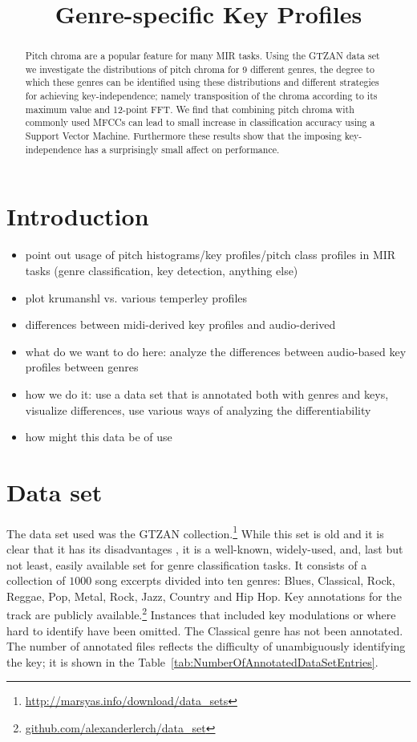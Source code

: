 \documentclass{article}
\title{Genre-specific Key Profiles}
\begin{document}
%
\maketitle
%
\begin{abstract}
Pitch chroma are a popular feature for many MIR tasks. Using the GTZAN data set we investigate the distributions of pitch chroma for 9 different genres, the degree to
which these genres can be identified using these distributions and different strategies for achieving key-independence; namely transposition of the chroma according to its maximum value and 12-point FFT. We find that combining pitch chroma with commonly used MFCCs can lead to small increase in classification accuracy using a Support Vector Machine. Furthermore these results show that the imposing key-independence has a surprisingly small affect on performance.
\end{abstract}
%
\section{Introduction}\label{sec:introduction}
\begin{itemize}
    \item   point out usage of pitch histograms/key profiles/pitch class profiles in MIR tasks (genre classification, key detection, anything else)
    \item   plot krumanshl vs. various temperley profiles
    \item   differences between midi-derived key profiles and audio-derived \cite{purwins_new_2000, gomez_tonal_2006}
    \item   what do we want to do here: analyze the differences between audio-based key profiles between genres
    \item   how we do it: use a data set that is annotated both with genres and keys, visualize differences, use various ways of analyzing the differentiability
    \item   how might this data be of use
\end{itemize}


\section{Data set}\label{sec:dataset}
The data set used was the GTZAN collection.\footnote{\url{http://marsyas.info/download/data_sets}} While this set is old and it is clear that it has its disadvantages \cite{sturm_analysis_2012}, it is a well-known, widely-used, and, last but not least, easily available set for genre classification tasks. It consists of a collection of $1000$ song excerpts divided into ten genres: Blues, Classical, Rock, Reggae, Pop, Metal, Rock, Jazz, Country and Hip Hop. Key annotations for the track are publicly available.\footnote{\url{github.com/alexanderlerch/data_set}} Instances that included key modulations or where hard to identify have been omitted. The Classical genre has not been annotated. The number of annotated files reflects the difficulty of unambiguously identifying the key; it is shown in the Table~\ref{tab:NumberOfAnnotatedDataSetEntries}. 
\end{document}
